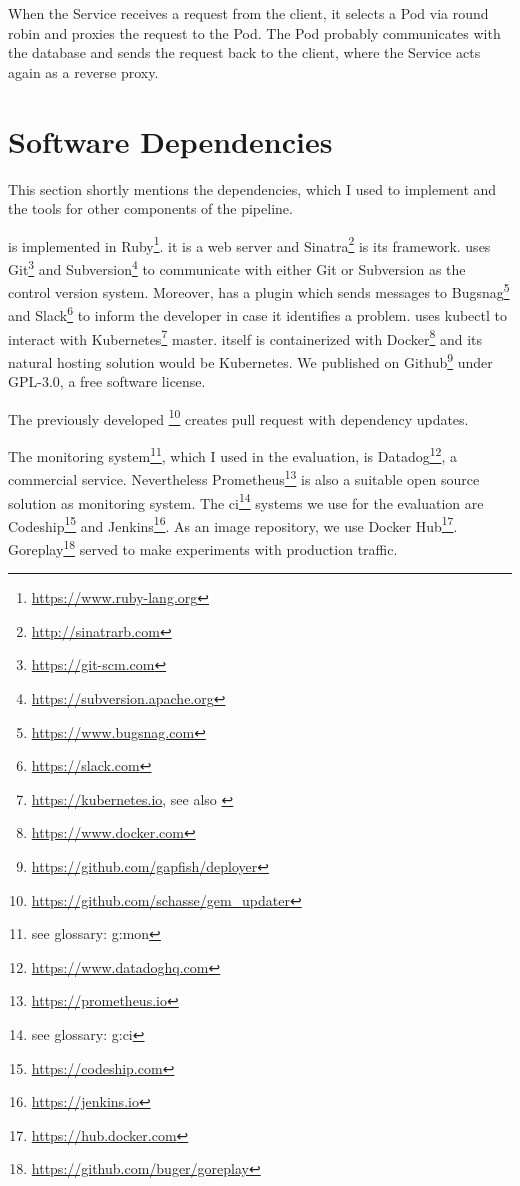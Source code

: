 When the Service receives a request from the client, it selects a Pod via round robin and
proxies the request to the Pod. The Pod probably communicates with the database and sends
the request back to the client, where the Service acts again as a reverse proxy.

\section{Software Dependencies}

This section shortly mentions the dependencies, which I used to implement \deployer{} and the
tools for other components of the pipeline.

\deployer{} is implemented in Ruby\footnote{\url{https://www.ruby-lang.org}}. it is a
web server and Sinatra\footnote{\url{http://sinatrarb.com}} is its framework. \deployer{} uses
Git\footnote{\url{https://git-scm.com}} and
Subversion\footnote{\url{https://subversion.apache.org}} to communicate with either Git or
Subversion as the control version system. Moreover, \deployer{} has a plugin which sends
messages to Bugsnag\footnote{\url{https://www.bugsnag.com}} and
Slack\footnote{\url{https://slack.com}} to inform the developer in case it identifies a
problem. \deployer{} uses kubectl to interact with
Kubernetes\footnote{\url{https://kubernetes.io}, see also
  \cite{kubernetes_architecture,kubernetes_architecture2}} master. \deployer{} itself is
containerized with Docker\footnote{\url{https://www.docker.com}} and its natural hosting
solution would be Kubernetes. We published \deployer{} on
Github\footnote{\url{https://github.com/gapfish/deployer}} under GPL-3.0, a free software
license.

The previously developed
\gemupdater{}\footnote{\url{https://github.com/schasse/gem_updater}} creates pull request
with dependency updates.

The monitoring system\footnote{see glossary: \gls{g:mon}}, which I used in the evaluation,
is Datadog\footnote{\url{https://www.datadoghq.com}}, a commercial service. Nevertheless
Prometheus\footnote{\url{https://prometheus.io}} is also a suitable open source solution
as monitoring system. The \gls{ci}\footnote{see glossary: \gls{g:ci}} systems we use for
the evaluation are Codeship\footnote{\url{https://codeship.com}} and
Jenkins\footnote{\url{https://jenkins.io}}. As an image repository, we use Docker
Hub\footnote{\url{https://hub.docker.com}}. Goreplay\footnote{\url{https://github.com/buger/goreplay}}
served to make experiments with production traffic.

